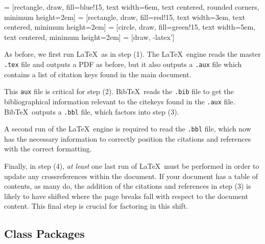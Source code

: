 \documentclass[justified]{tufte-handout}
\begin{document}
 = [rectangle, draw, fill=blue!15, text width=6em, text centered, rounded corners, minimum height=2em]
 = [rectangle, draw, fill=red!15, text width=3em, text centered, minimum height=2em]
 = [circle, draw, fill=green!15, text width=5em, text centered, minimum height=2em]
 = [draw, -latex']

\begin{figure*}
\end{figure*}

\noindent As before, we first run \LaTeX\, as in step (1). The \LaTeX\ engine reads the master \texttt{.tex} file and outputs a PDF as before, but it also outputs a \texttt{.aux} file which contains a list of citation keys found in the main document.

This \texttt{aux} file is critical for step (2). Bib\TeX\ reads the \texttt{.bib} file to get the bibliographical information relevant to the citekeys found in the \texttt{.aux} file. Bib\TeX\ outputs a \texttt{.bbl} file, which factors into step (3).

A second run of the \LaTeX\ engine is required to read the \texttt{.bbl} file, which now has the necessary information to correctly position the citations and references with the correct formatting.

Finally, in step (4), \textit{at least} one last run of \LaTeX\ must be performed in order to update any crossreferences within the document. If your document has a table of contents, as many do, the addition of the citations and references in step (3) is likely to have shifted where the page breaks fall with respect to the document content. This final step is crucial for factoring in this shift.


\subsection{Class Packages}
\end{document}
